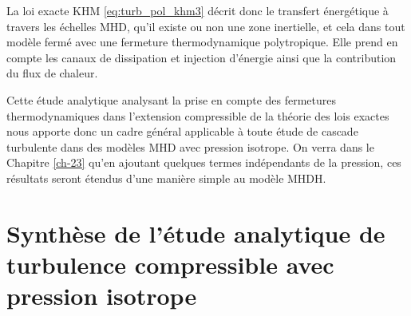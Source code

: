 La loi exacte \acs{KHM} \eqref{eq:turb_pol_khm3} décrit donc le transfert énergétique à travers les échelles \ac{MHD}, qu'il existe ou non une zone inertielle, et cela dans tout modèle fermé avec une fermeture thermodynamique polytropique. Elle prend en compte les canaux de dissipation et injection d'énergie ainsi que la contribution du flux de chaleur. 

Cette étude analytique analysant la prise en compte des fermetures thermodynamiques dans l'extension compressible de la théorie des lois exactes nous apporte donc un cadre général applicable à toute étude de cascade turbulente dans des modèles \ac{MHD} avec pression isotrope. On verra dans le Chapitre \ref{ch-23} qu'en ajoutant quelques termes indépendants de la pression, ces résultats seront étendus d'une manière simple au modèle \acs{MHDH}.

\newpage
\section{Synthèse de l'étude analytique de turbulence compressible avec pression isotrope}
\label{synt-13}

